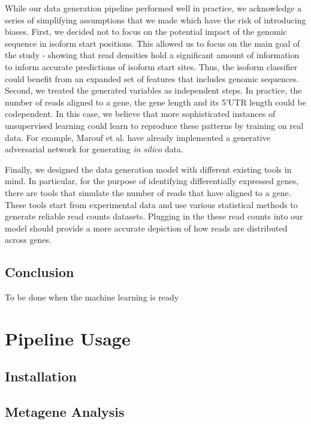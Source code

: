 \documentclass[12pt]{article}
\begin{document}
While our data generation pipeline performed well in practice, we acknowledge a series of simplifying assumptions that we made which have the risk of introducing biases. First, we decided not to focus on the potential impact of the genomic sequence in isoform start positions. This allowed us to focus on the main goal of the study - showing that read densities hold a significant amount of information to inform accurate predictions of isoform start sites. Thus, the isoform classifier could benefit from an expanded set of features that includes genomic sequences. Second, we treated the generated variables as independent steps. In practice, the number of reads aligned to a gene, the gene length and its 5'UTR length could be codependent. In this case, we believe that more sophisticated instances of unsupervised learning could learn to reproduce these patterns by training on real data. For example, Marouf et al. \cite{Marouf2020} have already implemented a generative adversarial network for generating \textit{in silico} data.

Finally, we designed the data generation model with different existing tools in mind. In particular, for the purpose of identifying differentially expressed genes, there are tools that simulate the number of reads that have aligned to a gene. These tools start from experimental data \cite{Griebel2012, Gerard2020} and use various statistical methods to generate reliable read counts datasets. Plugging in the these read counts into our model should provide a more accurate depiction of how reads are distributed across genes. 

\subsection{Conclusion}

To be done when the machine learning is ready

\section{Pipeline Usage}
\subsection{Installation}

\subsection{Metagene Analysis}
\end{document}
